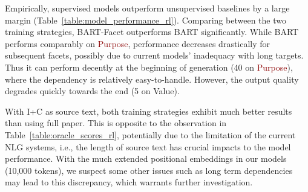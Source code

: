 \documentclass[11pt,a4paper]{article}
\newcommand{\absp}{\textcolor{darkred}{Purpose}\xspace}
\newcommand{\absv}{\textcolor{darkyellow}{Value}\xspace}
\newcommand{\bart}{BART\xspace}
\newcommand{\bartf}{BART-Facet\xspace}
\begin{document}
Empirically, supervised models outperform unsupervised baselines by a large margin (Table~\ref{table:model_performance_rl}).
Comparing between the two training strategies, \bartf  outperforms \bart significantly.
While \bart performs comparably on \absp, performance decreases drastically for subsequent facets, possibly due to current models' inadequacy with long targets.
Thus it can perform decently at the beginning of generation (40 on \absp), where the dependency is relatively easy-to-handle. 
However, the output quality degrades quickly towards the end (5 on \absv).

With I+C as source text, both training strategies exhibit much better results than using full paper. This is opposite to the observation in Table~\ref{table:oracle_scores_rl}, potentially due to the limitation of the current NLG systems, i.e., the length of source text has crucial impacts to the model performance.
With the much extended positional embeddings in our models (10,000 tokens), we suspect some other issues such as long term dependencies may lead to this discrepancy, which warrants further investigation.
\end{document}
